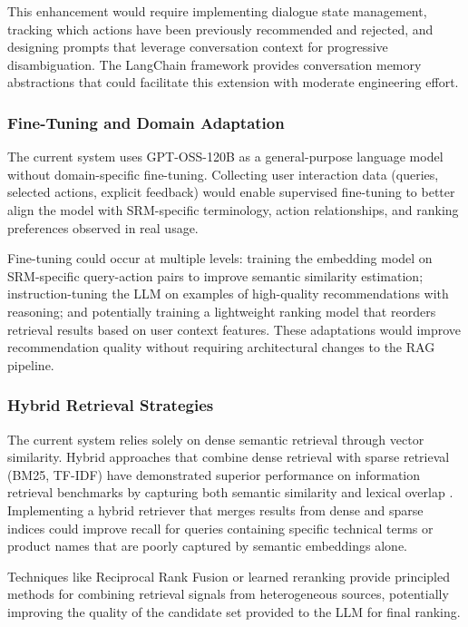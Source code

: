 This enhancement would require implementing dialogue state management, tracking which actions have been previously recommended and rejected, and designing prompts that leverage conversation context for progressive disambiguation. The LangChain framework provides conversation memory abstractions that could facilitate this extension with moderate engineering effort.

\subsubsection{Fine-Tuning and Domain Adaptation}

The current system uses GPT-OSS-120B \cite{mekrache2025ossgpt} as a general-purpose language model without domain-specific fine-tuning. Collecting user interaction data (queries, selected actions, explicit feedback) would enable supervised fine-tuning to better align the model with SRM-specific terminology, action relationships, and ranking preferences observed in real usage.

Fine-tuning could occur at multiple levels: training the embedding model on SRM-specific query-action pairs to improve semantic similarity estimation; instruction-tuning the LLM on examples of high-quality recommendations with reasoning; and potentially training a lightweight ranking model that reorders retrieval results based on user context features. These adaptations would improve recommendation quality without requiring architectural changes to the RAG pipeline.

\subsubsection{Hybrid Retrieval Strategies}

The current system relies solely on dense semantic retrieval through vector similarity. Hybrid approaches that combine dense retrieval with sparse retrieval (BM25, TF-IDF) have demonstrated superior performance on information retrieval benchmarks by capturing both semantic similarity and lexical overlap \cite{mudet2025hybridretrievalaugmentedgenerationrobust}. Implementing a hybrid retriever that merges results from dense and sparse indices could improve recall for queries containing specific technical terms or product names that are poorly captured by semantic embeddings alone.

Techniques like Reciprocal Rank Fusion \cite{cormack2009rrf} or learned reranking provide principled methods for combining retrieval signals from heterogeneous sources, potentially improving the quality of the candidate set provided to the LLM for final ranking.

